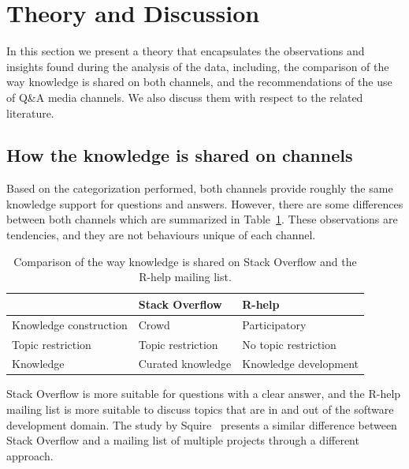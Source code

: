\section{Theory and Discussion}
\label{cha:theory}

    In this section we present a theory that encapsulates the observations and insights found during the analysis of the data, including, the comparison of the way knowledge is shared on both channels, and the recommendations of the use of Q\&A media channels.
    We also discuss them with respect to the related literature.

\subsection{How the knowledge is shared on channels}

    Based on the categorization performed, both channels provide roughly the same knowledge support for questions and answers.
    However, there are some differences between both channels which are summarized in Table~\ref{table:constrat}.
    These observations are tendencies, and they are not behaviours unique of each channel.

    \begin{table}[!htb]
      \centering
      \caption{Comparison of the way knowledge is shared on Stack Overflow and the R-help mailing list.}
      \label{table:constrat}
      \begin{small}
          \setlength{\tabcolsep}{5pt}
          \begin{tabular}{@{}lll@{}}
            \toprule
            \textbf{}      & \textbf{Stack Overflow} & \textbf{R-help}\\
            \midrule
            Knowledge construction & Crowd             & Participatory \\
            Topic restriction      & Topic restriction & No topic restriction \\
            Knowledge              & Curated knowledge & Knowledge development\\
            \bottomrule
          \end{tabular}
      \end{small}
    \end{table}

    Stack Overflow is more suitable for questions with a clear answer, and the R-help mailing list is more suitable to discuss topics that are in and out of the software development domain.
    The study by Squire~\cite{Squire2015a} presents a similar difference between Stack Overflow and a mailing list of multiple projects through a different approach.
    

